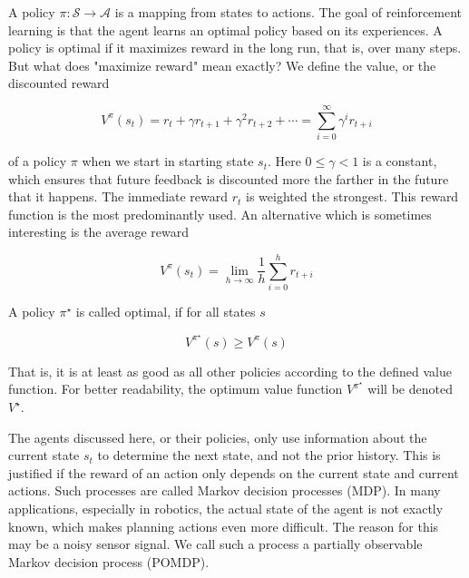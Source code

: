 \documentclass[10pt]{book}
\begin{document}
\begin{center}
\begin{enumerate}
\begin{center}
\begin{center}
\begin{center}
A policy $\pi: \mathcal{S} \rightarrow \mathcal{A}$ is a mapping from states to actions. The goal of reinforcement learning is that the agent learns an optimal policy based on its experiences. A policy is optimal if it maximizes reward in the long run, that is, over many steps. But what does "maximize reward" mean exactly? We define the value, or the discounted reward


\begin{equation*}
V^{\pi}\left(s_{t}\right)=r_{t}+\gamma r_{t+1}+\gamma^{2} r_{t+2}+\cdots=\sum_{i=0}^{\infty} \gamma^{i} r_{t+i} \tag{10.1}
\end{equation*}


of a policy $\pi$ when we start in starting state $s_{t}$. Here $0 \leq \gamma<1$ is a constant, which ensures that future feedback is discounted more the farther in the future that it happens. The immediate reward $r_{t}$ is weighted the strongest. This reward function is the most predominantly used. An alternative which is sometimes interesting is the average reward


\begin{equation*}
V^{\pi}\left(s_{t}\right)=\lim _{h \rightarrow \infty} \frac{1}{h} \sum_{i=0}^{h} r_{t+i} \tag{10.2}
\end{equation*}


A policy $\pi^{\star}$ is called optimal, if for all states $s$


\begin{equation*}
V^{\pi^{\star}}(s) \geq V^{\pi}(s) \tag{10.3}
\end{equation*}


That is, it is at least as good as all other policies according to the defined value function. For better readability, the optimum value function $V^{\pi^{\star}}$ will be denoted $V^{\star}$.

The agents discussed here, or their policies, only use information about the current state $s_{t}$ to determine the next state, and not the prior history. This is justified if the reward of an action only depends on the current state and current actions. Such processes are called Markov decision processes (MDP). In many applications, especially in robotics, the actual state of the agent is not exactly known, which makes planning actions even more difficult. The reason for this may be a noisy sensor signal. We call such a process a partially observable Markov decision process (POMDP).


\end{center}
\end{center}
\end{center}
\end{enumerate}
\end{center}
\end{document}
